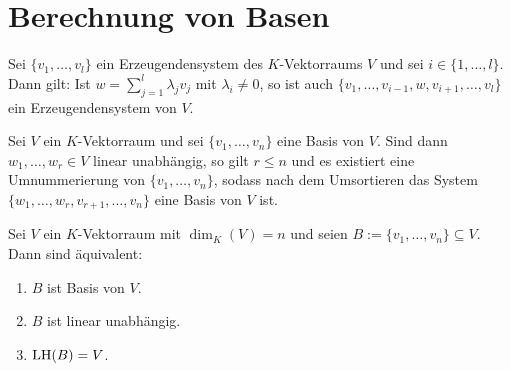 \section{Berechnung von Basen}

\begin{lemma}[Austauschlemma]
	\label{lemma:I.9.1}
	Sei $\{v_1,\dots,v_l\}$ ein Erzeugendensystem des $K$-Vektorraums $V$ und sei $i \in \{1,\dots,l\}$.
	Dann gilt:
	Ist $w = \sum_{j=1}^{l} \lambda_j v_j$ mit $\lambda_i \neq 0$, so ist auch $\{v_1,\dots,v_{i-1},w,v_{i+1},\dots,v_l\}$ ein Erzeugendensystem von $V$.
\end{lemma}

\begin{satz}[Basisergänzungssatz]
	\label{satz:I.9.2}
	Sei $V$ ein $K$-Vektorraum und sei $\{v_1,\dots,v_n\}$ eine Basis von $V$.
	Sind dann $w_1,\dots,w_r \in V$ linear unabhängig, so gilt $r \leq n$ und es existiert eine Umnummerierung von $\{v_1,\dots,v_n\}$, sodass nach dem Umsortieren das System $\{w_1,\dots,w_r,v_{r+1},\dots,v_n\}$ eine Basis von $V$ ist.
\end{satz}

\begin{satz}
	\label{satz:I.9.3}
	Sei $V$ ein $K$-Vektorraum mit $\dim_K(V) = n$ und seien $B := \{v_1,\dots,v_n\} \subseteq V$.
	Dann sind äquivalent:
	\begin{enumerate}[(1)]
		\item $B$ ist Basis von $V$.
		\item $B$ ist linear unabhängig.
		\item $\operatorname{LH}(B) = V$.
	\end{enumerate}
\end{satz}


